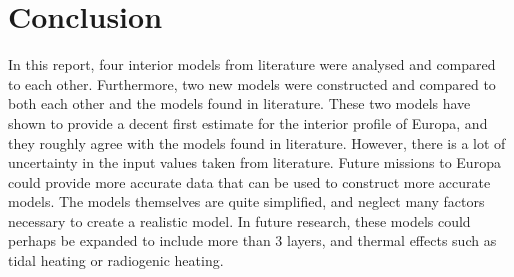 \documentclass[twocolumn]{article}
\begin{document}
\section{Conclusion}
In this report, four interior models from literature were analysed and compared to each other. Furthermore, two new models were constructed and compared to both each other and the models found in literature. These two models have shown to provide a decent first estimate for the interior profile of Europa, and they roughly agree with the models found in literature. However, there is a lot of uncertainty in the input values taken from literature. Future missions to Europa could provide more accurate data that can be used to construct more accurate models. The models themselves are quite simplified, and neglect many factors necessary to create a realistic model. In future research, these models could perhaps be expanded to include more than 3 layers, and thermal effects such as tidal heating or radiogenic heating.



\end{document}
